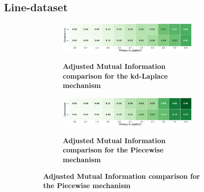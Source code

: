 \subsection{Line-dataset}
\begin{figure}[H]
    \centering
    \begin{subfigure}[b]{0.85\textwidth}
        \begin{subfigure}[c]{1\textwidth}
            \caption{\textbf{Adjusted Mutual Information comparison for the kd-Laplace mechanism}}
            \includegraphics[width=1\textwidth]{Results/kd-laplace/kd-Laplace/line-dataset/ami.png}
            \label{fig:ami_line-dataset_comparison_kdlaplace_2d}
        \end{subfigure}
        \vfill %
        \begin{subfigure}[c]{1\textwidth}
            \caption{\textbf{Adjusted Mutual Information comparison for the Piecewise mechanism}}
            \includegraphics[width=1\textwidth]{Results/kd-laplace/piecewise/line-dataset/ami.png}
            \label{fig:ami_line-dataset_comparison_piecewise_2d}
        \end{subfigure}
    \end{subfigure}
    \hfill %
    \begin{subfigure}[b]{0.075\textwidth}

\end{subfigure}
\end{figure}

